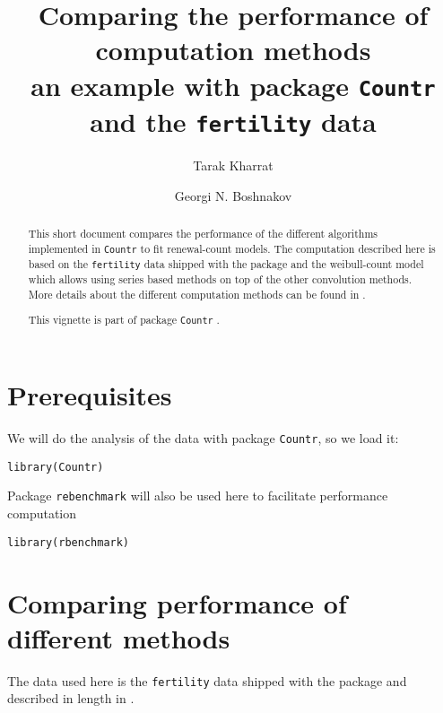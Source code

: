 \documentclass[a4paper,twoside,11pt]{article}
\author[1]{Tarak Kharrat}
\author[2]{Georgi N. Boshnakov}
\affil[1]{Salford Business School, University of Salford, UK.}
\affil[2]{School of Mathematics, University of Manchester, UK.}
\date{}
\title{Comparing the performance of computation methods\\\medskip
\large an example with package \texttt{Countr} and the \texttt{fertility} data}
\begin{document}
\maketitle
\begin{abstract}
This short document compares the performance of the different algorithms
implemented in \texttt{Countr} to fit renewal-count models. The computation described
here is based on the \texttt{fertility} data shipped with the package and the
weibull-count model which allows using series based methods on top of the other
convolution methods. More details about the different computation methods can be
found in \citet{baker2017event}.

This vignette is part of package \texttt{Countr} \citep[see][]{CountrJssArticle}.
\end{abstract}


\section{Prerequisites}
\label{sec:org6deafec}

We will do the analysis of the data with package \texttt{Countr}, so we load it:
\begin{verbatim}
library(Countr)
\end{verbatim}

Package \texttt{rebenchmark} \citep{rbench2012} will also be used here to facilitate
performance computation
\begin{verbatim}
library(rbenchmark) 
\end{verbatim}

\section{Comparing performance of different methods}
\label{sec:org7674dd3}
The data used here is the \texttt{fertility} data shipped with the package and
described in length in \citet{winkelmann1995duration}. 
\end{document}
